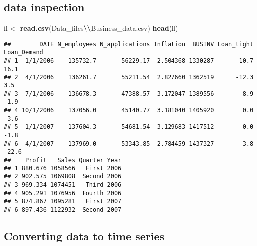 \documentclass[
]{article}
\newenvironment{Shaded}{\begin{snugshade}}{\end{snugshade}}
\newcommand{\FunctionTok}[1]{\textcolor[rgb]{0.13,0.29,0.53}{\textbf{#1}}}
\newcommand{\NormalTok}[1]{#1}
\newcommand{\OtherTok}[1]{\textcolor[rgb]{0.56,0.35,0.01}{#1}}
\newcommand{\SpecialCharTok}[1]{\textcolor[rgb]{0.81,0.36,0.00}{\textbf{#1}}}
\newcommand{\StringTok}[1]{\textcolor[rgb]{0.31,0.60,0.02}{#1}}
\begin{document}
\subsection{data inspection}\label{data-inspection}

\begin{Shaded}
\begin{Highlighting}[]
\NormalTok{fl }\OtherTok{\textless{}{-}} \FunctionTok{read.csv}\NormalTok{(}\StringTok{\textquotesingle{}Data\_files}\SpecialCharTok{\textbackslash{}\textbackslash{}}\StringTok{Business\_data.csv\textquotesingle{}}\NormalTok{)}
\FunctionTok{head}\NormalTok{(fl)}
\end{Highlighting}
\end{Shaded}

\begin{verbatim}
##        DATE N_employees N_applications Inflation  BUSINV Loan_tight Loan_Demand
## 1  1/1/2006    135732.7       56229.17  2.504368 1330287      -10.7        16.1
## 2  4/1/2006    136261.7       55211.54  2.827660 1362519      -12.3         3.5
## 3  7/1/2006    136678.3       47388.57  3.172047 1389556       -8.9        -1.9
## 4 10/1/2006    137056.0       45140.77  3.181040 1405920        0.0        -3.6
## 5  1/1/2007    137604.3       54681.54  3.129683 1417512        0.0        -1.8
## 6  4/1/2007    137969.0       53343.85  2.784459 1437327       -3.8       -22.6
##    Profit   Sales Quarter Year
## 1 880.676 1058566   First 2006
## 2 902.575 1069808  Second 2006
## 3 969.334 1074451   Third 2006
## 4 905.291 1076956  Fourth 2006
## 5 874.867 1095281   First 2007
## 6 897.436 1122932  Second 2007
\end{verbatim}

\subsection{Converting data to time
series}\label{converting-data-to-time-series}
\end{document}
